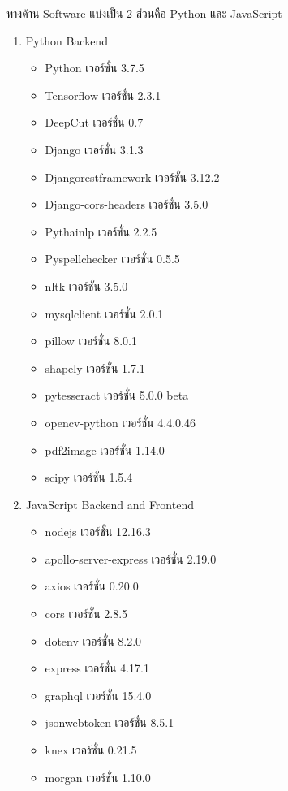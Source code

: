 		ทางด้าน Software แบ่งเป็น 2 ส่วนคือ Python และ JavaScript 
        \begin{enumerate}
            \item Python Backend
            \begin{itemize}
                \item Python เวอร์ชั่น 3.7.5
		        \item Tensorflow เวอร์ชั่น 2.3.1
		        \item DeepCut เวอร์ชั่น 0.7
		        \item Django เวอร์ชั่น 3.1.3
		        \item Djangorestframework เวอร์ชั่น 3.12.2
		        \item Django-cors-headers เวอร์ชั่น 3.5.0
		        \item Pythainlp เวอร์ชั่น 2.2.5
		        \item Pyspellchecker เวอร์ชั่น 0.5.5
		        \item nltk เวอร์ชั่น 3.5.0
		        \item mysqlclient เวอร์ชั่น 2.0.1
		        \item pillow เวอร์ชั่น 8.0.1
		        \item shapely เวอร์ชั่น 1.7.1
		        \item pytesseract เวอร์ชั่น 5.0.0 beta
		        \item opencv-python เวอร์ชั่น 4.4.0.46
		        \item pdf2image เวอร์ชั่น 1.14.0
		        \item scipy เวอร์ชั่น 1.5.4
            \end{itemize}
            \item JavaScript Backend and Frontend
		    \begin{itemize}
                \item nodejs เวอร์ชั่น 12.16.3
		        \item apollo-server-express เวอร์ชั่น 2.19.0
		        \item axios เวอร์ชั่น 0.20.0
		        \item cors เวอร์ชั่น 2.8.5
 		        \item dotenv เวอร์ชั่น 8.2.0
		        \item express เวอร์ชั่น 4.17.1
		        \item graphql เวอร์ชั่น 15.4.0
		        \item jsonwebtoken เวอร์ชั่น 8.5.1
		        \item knex เวอร์ชั่น 0.21.5
		        \item morgan เวอร์ชั่น 1.10.0

\end{itemize}
\end{enumerate}
